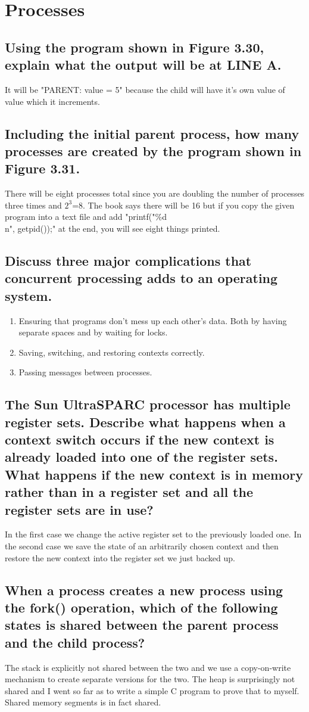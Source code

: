 \documentclass{book}%
\begin{document}
\chapter{Processes}
\section{Using the program shown in Figure 3.30, explain what the output will be at LINE A.}
It will be "PARENT: value = 5" because the child will have it's own value of value which it increments.
\section{Including the initial parent process, how many processes are created by the program shown in Figure 3.31.}
There will be eight processes total since you are doubling the number of processes three times and $2^3$=8. The book says there will be 16 but if you copy the given program into a text file and add "printf("\%d\\n", getpid());" at the end, you will see eight things printed. 
\section{Discuss three major complications that concurrent processing adds to an operating system.}
\begin{enumerate}
\item Ensuring that programs don't mess up each other's data. Both by having separate spaces and by waiting for locks.
\item Saving, switching, and restoring contexts correctly.
\item Passing messages between processes.
\end{enumerate}
\section{The Sun UltraSPARC processor has multiple register sets. Describe what happens when a context switch occurs if the new context is already loaded into one of the register sets. What happens if the new context is in memory rather than in a register set and all the register sets are in use?}
In the first case we change the active register set to the previously loaded one. In the second case we save the state of an arbitrarily chosen context and then restore the new context into the register set we just backed up.
\section{When a process creates a new process using the fork() operation, which of the following states is shared between the parent process and the child process?}
The stack is explicitly not shared between the two and we use a copy-on-write mechanism to create separate versions for the two. The heap is surprisingly not shared and I went so far as to write a simple C program to prove that to myself. Shared memory segments is in fact shared.
\end{document}
